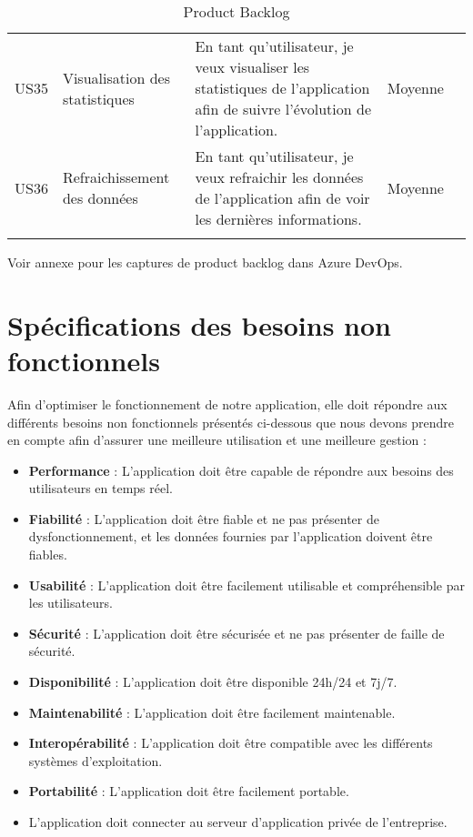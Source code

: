 \begin{landscape}
\begin{adjustwidth}{-1cm}{}
\begin{longtable}{|c|p{5cm}|p{12cm}|c|c|}
    \cline{1-4}
    US35&Visualisation des statistiques&En tant qu'utilisateur, je veux visualiser les statistiques de l'application afin de suivre l'évolution de l'application.&Moyenne&\\
    
    \cline{1-4}
    US36&Refraichissement des données&En tant qu'utilisateur, je veux refraichir les données de l'application afin de voir les dernières informations.&Moyenne&\\


    \hline
        \caption{Product Backlog}
        \label{tab:product_backlog}
      
      \end{longtable}
    \end{adjustwidth}
\end{landscape}

Voir annexe pour les captures de product backlog dans Azure DevOps.

\section{Spécifications des besoins non fonctionnels}
Afin d'optimiser le fonctionnement de notre application, elle doit répondre aux différents besoins non fonctionnels présentés ci-dessous que nous devons prendre en compte afin d'assurer une meilleure utilisation et une meilleure gestion :

\begin{itemize}
\item \textbf{Performance} : L'application doit être capable de répondre aux besoins des utilisateurs en temps réel.
\item \textbf{Fiabilité} : L'application doit être fiable et ne pas présenter de dysfonctionnement, et les données fournies par l'application doivent être fiables.
\item \textbf{Usabilité} : L'application doit être facilement utilisable et compréhensible par les utilisateurs.
\item \textbf{Sécurité} : L'application doit être sécurisée et ne pas présenter de faille de sécurité.
\item \textbf{Disponibilité} : L'application doit être disponible 24h/24 et 7j/7.
\item \textbf{Maintenabilité} : L'application doit être facilement maintenable.
\item \textbf{Interopérabilité} : L'application doit être compatible avec les différents systèmes d'exploitation.
\item \textbf{Portabilité} : L'application doit être facilement portable.
\item L'application doit connecter au serveur d'application privée de l'entreprise.
\end{itemize}

